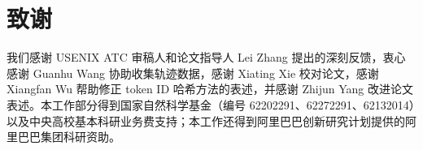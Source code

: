 \section*{致谢}
我们感谢 USENIX ATC 审稿人和论文指导人 Lei Zhang 提出的深刻反馈，衷心感谢 Guanhu Wang 协助收集轨迹数据，感谢 Xiating Xie 校对论文，感谢 Xiangfan Wu 帮助修正 token ID 哈希方法的表述，并感谢 Zhijun Yang 改进论文表述。本工作部分得到国家自然科学基金（编号 62202291、62272291、62132014）以及中央高校基本科研业务费支持；本工作还得到阿里巴巴创新研究计划提供的阿里巴巴集团科研资助。
